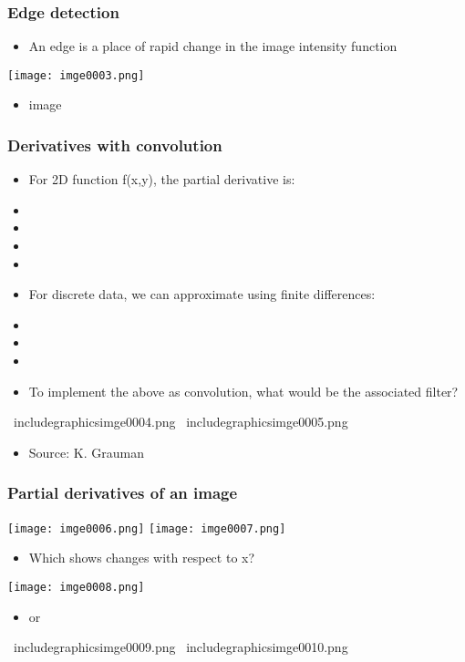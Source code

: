 \begin{frame}
\frametitle{Edge detection}
\begin{itemize}
\item An edge is a place of rapid change in the image intensity function
\end{itemize}
\texttt{[image: imge0003.png]}
\begin{itemize}
\item image
\end{itemize}

\end{frame}


\begin{frame}
\frametitle{Derivatives with convolution}
\begin{itemize}
\item For 2D function f(x,y), the partial derivative is:
\item
\item
\item
\item
\item For discrete data, we can approximate using finite differences:
\item
\item
\item
\item To implement the above as convolution, what would be  the associated filter?
\end{itemize}
\ includegraphics{imge0004.png}
\ includegraphics{imge0005.png}
\begin{itemize}
\item Source: K. Grauman
\end{itemize}

\end{frame}


\begin{frame}
\frametitle{Partial derivatives of an image}
\texttt{[image: imge0006.png]}
\texttt{[image: imge0007.png]}
\begin{itemize}
\item Which shows changes with respect to x?
\end{itemize}
\texttt{[image: imge0008.png]}
\begin{itemize}
\item or
\end{itemize}
\ includegraphics{imge0009.png}
\ includegraphics{imge0010.png}

\end{frame}


